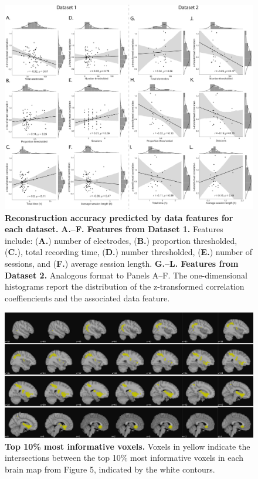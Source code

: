 \documentclass{article}
\begin{document}
\begin{figure}[ptb]
\centering
\includegraphics[width=\textwidth]{figs/supplemental_4}
\caption{\small \textbf{Reconstruction accuracy predicted by data
    features for each dataset.} \textbf{A.--F.  Features from Dataset
    1.}  Features include: (\textbf{A.}) number of electrodes,
  (\textbf{B.}) proportion thresholded, (\textbf{C.}), total recording
  time, (\textbf{D.}) number thresholded, (\textbf{E.}) number of
  sessions, and (\textbf{F.}) average session length.
 \textbf{G.--L. Features from Dataset 2.}  Analogous format to
  Panels A--F. The one-dimensional histograms report the distribution of
  the z-transformed correlation coeffiencients and the associated data
feature.}
\label{fig:supplemental_4}
\end{figure}


\begin{figure}[ptb]
\centering
\includegraphics[width=\textwidth]{figs/supplemental_5}
\caption{\small \textbf{ Top 10\% most informative voxels.}
 Voxels in yellow indicate the intersections between
    the top 10\% most informative voxels in each brain map from Figure
    5, indicated by the white contours.}
\label{fig:supplemental_5}
\end{figure}


% 
\end{document}
